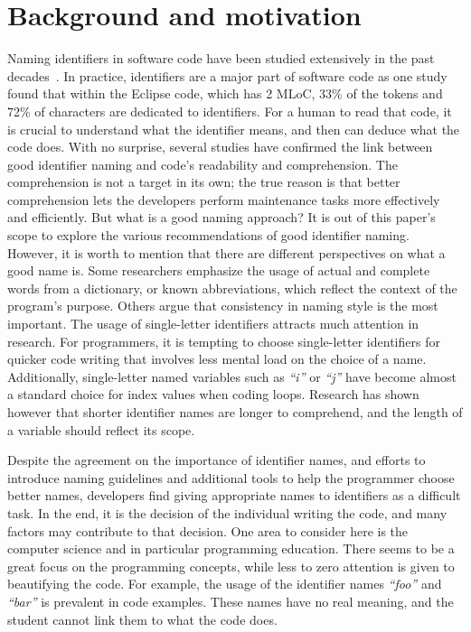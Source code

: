 \documentclass[conference]{IEEEtran}
\newcommand{\quotes}[1]{\textit{``#1''}}
\begin{document}
\section{Background and motivation}
Naming identifiers in software code have been studied extensively in the past decades~\cite{AmanASK15,AnquetilL98,AvidanF17,Beniamini,ButlerWYS10,CaprileT00,HofmeisterSH17,LawrieMFB07,LunguK13,ScannielloR13,TakangGM96,TramontanaRS14}. In practice, identifiers are a major part of software code as one study found that within the Eclipse code, which has 2 MLoC, 33\% of the tokens and 72\% of characters are dedicated to identifiers. For a human to read that code, it is crucial to understand what the identifier means, and then can deduce what the code does. With no surprise, several studies have confirmed the link between good identifier naming and code's readability and comprehension. The comprehension is not a target in its own; the true reason is that better comprehension lets the developers perform maintenance tasks more effectively and efficiently.
But what is a good naming approach? It is out of this paper's scope to explore the various recommendations of good identifier naming. However, it is worth to mention that there are different perspectives on what a good name is. Some researchers emphasize the usage of actual and complete words from a dictionary, or known abbreviations, which reflect the context of the program's purpose. Others argue that consistency in naming style is the most important. The usage of single-letter identifiers attracts much attention in research. For programmers, it is tempting to choose single-letter identifiers for quicker code writing that involves less mental load on the choice of a name. Additionally, single-letter named variables such as \quotes{i} or \quotes{j} have become almost a standard choice for index values when coding loops. Research has shown however that shorter identifier names are longer to comprehend, and the length of a variable should reflect its scope. 

Despite the agreement on the importance of identifier names, and efforts to introduce naming guidelines and additional tools to help the programmer choose better names, developers find giving appropriate names to identifiers as a difficult task. In the end, it is the decision of the individual writing the code, and many factors may contribute to that decision. One area to consider here is the computer science and in particular programming education. There seems to be a great focus on the programming concepts, while less to zero attention is given to beautifying the code. For example, the usage of the identifier names \quotes{foo} and \quotes{bar} is prevalent in code examples. These names have no real meaning, and the student cannot link them to what the code does.  
\end{document}

